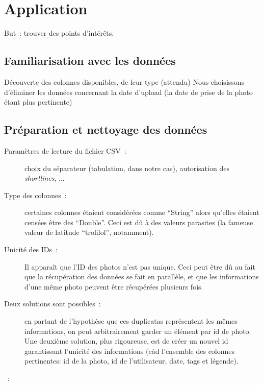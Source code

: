 \chapter{Application}

    But~: trouver des points d’intérêts.

\section{Familiarisation avec les données}
    Découverte des colonnes disponibles, de leur type (attendu)
    Nous choisissons d'éliminer les données concernant la date d'upload (la date de prise de la photo étant plus pertinente)


\section{Préparation et nettoyage des données}

    \begin{description}
        \item[Paramètres de lecture du fichier CSV~:] choix du séparateur (tabulation, dans notre cas), autorisation des \textit{shortlines}, ...
        \item[Type des colonnes~:] certaines colonnes étaient considérées comme ``String'' alors qu'elles étaient censées être des ``Double''. Ceci est dû à des valeurs parasites (la fameuse valeur de latitude ``trolilol'', notamment).
        \item[Unicité des IDs~:] Il apparaît que l'ID des photos n'est pas unique. Ceci peut être dû au fait que la récupération des données se fait en parallèle, et que les informations d'une même photo peuvent être récupérées plusieurs fois.
        \item[Deux solutions sont possibles~:] en partant de l'hypothèse que ces duplicatas représentent les mêmes informations, on peut arbitrairement garder un élément par id de photo. Une deuxième solution, plus rigoureuse, est de créer un nouvel id garantissant l'unicité des informations (càd l'ensemble des colonnes pertinentes: id de la photo, id de l'utilisateur, date, tags et légende).
        \item[~:]
    \end{description}


